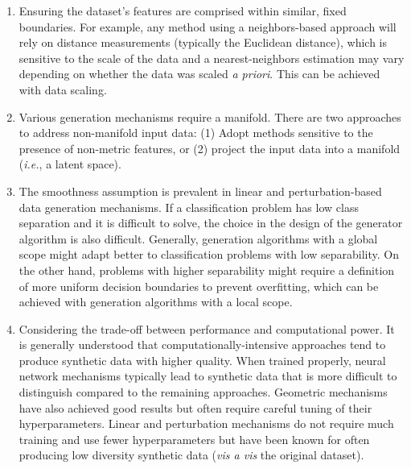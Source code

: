 \begin{enumerate}

    \item Ensuring the dataset's features are comprised within similar, fixed
        boundaries. For example, any method using a neighbors-based approach
        will rely on distance measurements (typically the Euclidean distance),
        which is sensitive to the scale of the data and a nearest-neighbors
        estimation may vary depending on whether the data was scaled \textit{a
        priori}. This can be achieved with data scaling. 

    \item Various generation mechanisms require a manifold. There are two
        approaches to address non-manifold input data: (1) Adopt methods
        sensitive to the presence of non-metric features, or (2) project the
        input data into a manifold (\textit{i.e.}, a latent space).

    \item The smoothness assumption is prevalent in linear and
        perturbation-based data generation mechanisms. If a classification
        problem has low class separation and it is difficult to solve, the choice in
        the design of the generator algorithm is also difficult. Generally,
        generation algorithms with a global scope might adapt better to
        classification problems with low separability. On the other hand,
        problems with higher separability might require a definition of more
        uniform decision boundaries to prevent overfitting, which can be
        achieved with generation algorithms with a local scope.

    \item Considering the trade-off between performance and computational
        power. It is generally understood that computationally-intensive
        approaches tend to produce synthetic data with higher quality. When
        trained properly, neural network mechanisms typically lead to
        synthetic data that is more difficult to distinguish compared to the
        remaining approaches. Geometric mechanisms have also achieved good
        results but often require careful tuning of their hyperparameters.
        Linear and perturbation mechanisms do not require much training and
        use fewer hyperparameters but have been known for often producing low
        diversity synthetic data (\textit{vis a vis} the original dataset).

\end{enumerate}

